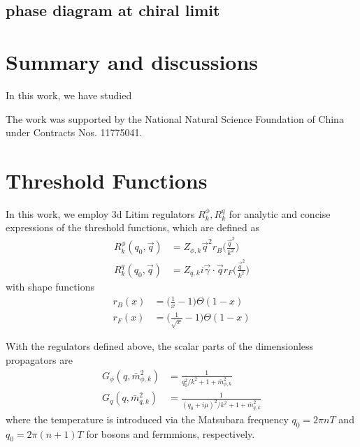 \documentclass[%
reprint,
superscriptaddress,
showpacs,preprintnumbers,
 amsmath,amssymb,
 aps,
prd,
]{revtex4-1}
\begin{document}
\subsection{phase diagram at chiral limit}


\section{Summary and discussions}
\label{sec:sum}

In this work, we have studied


\begin{acknowledgments}

The work was supported by the National Natural Science Foundation of China under Contracts Nos. 11775041.

\end{acknowledgments}

\appendix

\section{Threshold Functions}
\label{app:threshold_fun}

In this work, we employ 3d Litim regulators $R^\phi_k,R^q_k$\cite{Litim:2000ci,Litim:2001up} for analytic and concise expressions of the threshold functions, which are defined as
\begin{align}
	R^\phi_k(q_0,\vec{q})&=Z_{\phi,k} \vec{q}^2 r_B\Big(\frac{\vec{q}^2}{k^2}\Big)\nonumber \\[2ex]
	R^q_k(q_0,\vec{q})&=Z_{q,k} i \vec{\gamma} \cdot \vec{q} r_{F}\Big(\frac{\vec{q}^2}{k^2}\Big)\label{eq:regulators}
\end{align}
with shape functions
\begin{align}
	r_B(x)&=\Big(\frac{1}{x}-1\Big)\Theta(1-x)\nonumber \\[2ex]
	r_F(x)&=\Big(\frac{1}{\sqrt{x}}-1\Big)\Theta(1-x)
\end{align}

With the regulators defined above, the scalar parts of the dimensionless propagators are
\begin{align}
	G_\phi(q,\bar{m}_{\phi,k}^2)&=\frac{1}{q_0^2/k^2+1+\bar{m}_{\phi,k}^2}\nonumber \\[2ex]
	G_q(q,\bar{m}_{q,k}^2)&=\frac{1}{(q_0+i \mu)^2/k^2+1+\bar{m}_{q,k}^2}\label{eq:propagators}
\end{align}
where the temperature is introduced via the Matsubara frequency $q_0=2 \pi n T$ and $q_0=2 \pi (n+1)T$ for bosons and fermmions, respectively.
\end{document}

